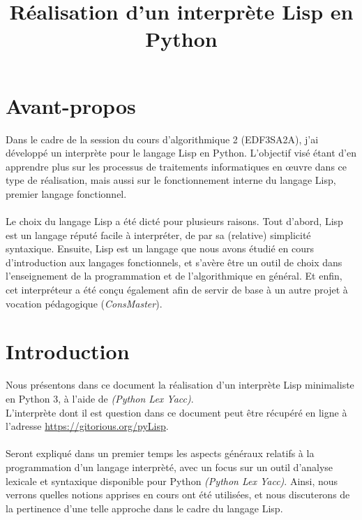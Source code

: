 \documentclass{article}
\title{Réalisation d'un interprète Lisp en Python}
\author{}
\date{}
\begin{document}
\maketitle

\section{Avant-propos}

Dans le cadre de la session du cours d'algorithmique 2 (EDF3SA2A), j'ai développé un interprète pour le langage Lisp en Python. 
L'objectif visé étant d'en apprendre plus sur les processus de traitements informatiques en œuvre dans ce type de réalisation,
mais aussi sur le fonctionnement interne du langage Lisp, premier langage fonctionnel.
\paragraph{}
Le choix du langage Lisp a été dicté pour plusieurs raisons. 
Tout d'abord, Lisp est un langage réputé facile à interpréter, de par sa (relative) simplicité syntaxique.
Ensuite, Lisp est un langage que nous avons étudié en cours d'introduction aux langages fonctionnels, 
et s'avère être un outil de choix dans l'enseignement de la programmation et de l'algorithmique en général.
Et enfin, cet interpréteur a été conçu également afin de servir de base à un autre projet à vocation pédagogique (\emph{ConsMaster}).


\section{Introduction}

Nous présentons dans ce document la réalisation d'un interprète Lisp minimaliste en Python 3, à l'aide de \emph{(Python Lex Yacc)}.
\\ 
L'interprète dont il est question dans ce document peut être récupéré en ligne à l'adresse \url{https://gitorious.org/pyLisp}.
\paragraph{}
Seront expliqué dans un premier temps les aspects généraux relatifs à la programmation d'un langage interprèté,
avec un focus sur un outil d'analyse lexicale et syntaxique disponible pour Python \emph{(Python Lex Yacc)}.
Ainsi, nous verrons quelles notions apprises en cours ont été utilisées, 
et nous discuterons de la pertinence d'une telle approche dans le cadre du langage Lisp.
\end{document}

